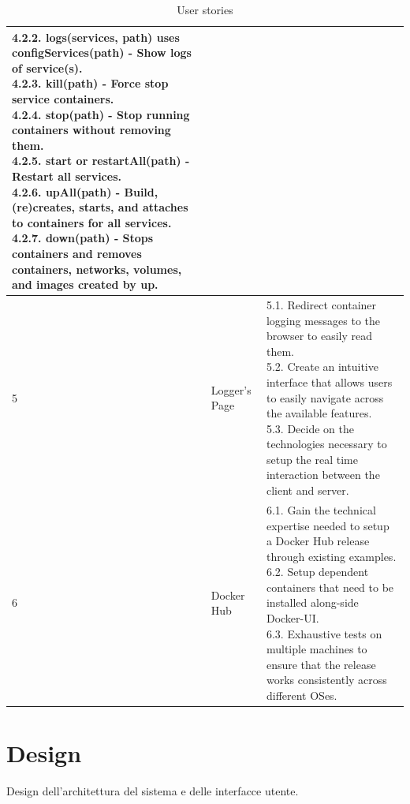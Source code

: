 \documentclass[multi, tikz]{article}
\begin{document}
\begin{table}[!ht]
{\begin{tabular}{|l|l|l|}
{          4.2.2. logs(services, path) uses configServices(path) - Show logs of service(s).\\
          4.2.3. kill(path) - Force stop service containers.\\
          4.2.4. stop(path) - Stop running containers without removing them.\\
          4.2.5. start or restartAll(path) - Restart all services.\\
          4.2.6. upAll(path) - Build, (re)creates, starts, and attaches to containers for all services.\\
          4.2.7. down(path) - Stops containers and removes containers, networks, volumes, and images created by up.
        }
        \\ \hline
        5 & Logger's Page &
        \makecell[l]{
          5.1. Redirect container logging messages to the browser to easily read them.\\
          5.2. Create an intuitive interface that allows users to easily navigate across the available features.\\
          5.3. Decide on the technologies necessary to setup the real time interaction between the client and server.
        }
        \\ \hline
        6 & Docker Hub &
        \makecell[l]{
          6.1. Gain the technical expertise needed to setup a Docker Hub release through existing examples. \\
          6.2. Setup dependent containers that need to be installed along-side Docker-UI.\\
          6.3. Exhaustive tests on multiple machines to ensure that the release works consistently across different OSes.
        }
        \\ \hline
    \end{tabular}
    }%
    \caption{User stories}
\end{table}%



\section{Design}
Design dell'architettura del sistema e delle interfacce utente.



\end{document}
